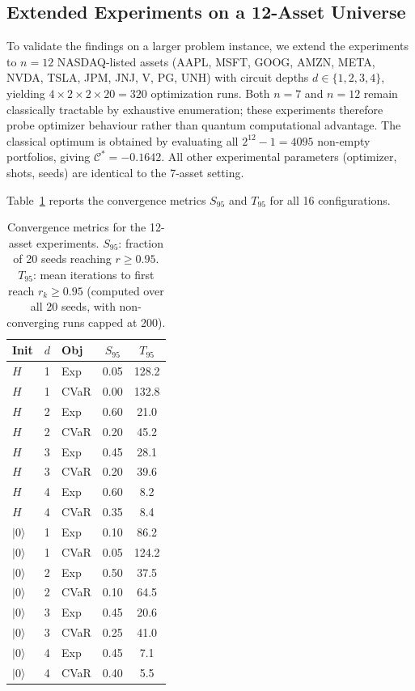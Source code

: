 \documentclass[runningheads]{llncs}
\begin{document}
\subsection{Extended Experiments on a 12-Asset Universe}
\label{sec:extended}

To validate the findings on a larger problem instance, we extend the experiments to $n = 12$ NASDAQ-listed assets (AAPL, MSFT, GOOG, AMZN, META, NVDA, TSLA, JPM, JNJ, V, PG, UNH) with circuit depths $d \in \{1, 2, 3, 4\}$, yielding $4 \times 2 \times 2 \times 20 = 320$ optimization runs. Both $n = 7$ and $n = 12$ remain classically tractable by exhaustive enumeration; these experiments therefore probe optimizer behaviour rather than quantum computational advantage. The classical optimum is obtained by evaluating all $2^{12} - 1 = 4095$ non-empty portfolios, giving $\mathcal{C}^* = -0.1642$. All other experimental parameters (optimizer, shots, seeds) are identical to the 7-asset setting.

Table~\ref{tab:s95_t95} reports the convergence metrics $S_{95}$ and $T_{95}$ for all 16 configurations.

\begin{table}[t]
\caption{Convergence metrics for the 12-asset experiments. $S_{95}$: fraction of 20 seeds reaching $r \geq 0.95$. $T_{95}$: mean iterations to first reach $r_k \geq 0.95$ (computed over all 20 seeds, with non-converging runs capped at 200).}
\label{tab:s95_t95}
\centering
\begin{tabular}{lllcc}
\hline
\textbf{Init} & \textbf{$d$} & \textbf{Obj} & \textbf{$S_{95}$} & \textbf{$T_{95}$} \\
\hline
$H$         & 1 & Exp  & 0.05 & 128.2 \\
$H$         & 1 & CVaR & 0.00 & 132.8 \\
$H$         & 2 & Exp  & 0.60 & 21.0  \\
$H$         & 2 & CVaR & 0.20 & 45.2  \\
$H$         & 3 & Exp  & 0.45 & 28.1  \\
$H$         & 3 & CVaR & 0.20 & 39.6  \\
$H$         & 4 & Exp  & 0.60 & 8.2   \\
$H$         & 4 & CVaR & 0.35 & 8.4   \\
\hline
$|0\rangle$ & 1 & Exp  & 0.10 & 86.2  \\
$|0\rangle$ & 1 & CVaR & 0.05 & 124.2 \\
$|0\rangle$ & 2 & Exp  & 0.50 & 37.5  \\
$|0\rangle$ & 2 & CVaR & 0.10 & 64.5  \\
$|0\rangle$ & 3 & Exp  & 0.45 & 20.6  \\
$|0\rangle$ & 3 & CVaR & 0.25 & 41.0  \\
$|0\rangle$ & 4 & Exp  & 0.45 & 7.1   \\
$|0\rangle$ & 4 & CVaR & 0.40 & 5.5   \\
\hline
\end{tabular}
\end{table}
\end{document}
